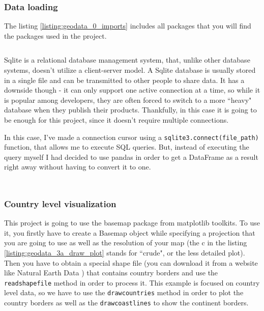 \documentclass[12pt, a4paper]{article}
\begin{document}
\subsubsection{Data loading}


The listing \ref{listing:geodata_0_imports} includes all packages that you will find the packages used in the project.

\bgroup
  \inputminted[linenos, breaklines=true, fontsize=\scriptsize]{python}{src/geo/map/0_imports.py}
  \label{listing:geodata_0_imports}
\egroup


Sqlite \cite{owens2010sqlite} is a relational database management system, that, unlike other database systems, doesn't utilize a client-server model. A Sqlite database is usually stored in a single file and can be transmitted to other people to share data. It has a downside though - it can only support one active connection at a time, so while it is popular among developers, they are often forced to switch to a more ``heavy" database when they publish their products. Thankfully, in this case it is going to be enough for this project, since it doesn't require multiple connections.

In this case, I've made a connection cursor using a \texttt{sqlite3.connect(file\_path)} function, that allows me to execute SQL queries. But, instead of executing the query myself I had decided to use pandas in order to get a DataFrame as a result right away without having to convert it to one.

\bgroup
  \inputminted[linenos, breaklines=true, fontsize=\scriptsize, firstnumber=last]{python}{src/geo/map/1_data_loading.py}
  \label{listing:geodata_1_data_loading}
\egroup

\bgroup
  \inputminted[linenos, breaklines=true, fontsize=\scriptsize, firstnumber=last]{python}{src/geo/map/2_duplicate_columns.py}
  \label{listing:geodata_2_duplicate_columns}
\egroup

\subsubsection{Country level visualization}

This project is going to use the basemap package from matplotlib toolkits.
To use it, you firstly have to create a Basemap object while specifying a projection that you are going to use as well as the resolution of your map (the c in the listing \ref{listing:geodata_3a_draw_plot} stands for ``crude", or the less detailed plot). Then you have to obtain a special shape file (you can download it from a website like Natural Earth Data \cite{naturalearthdata}) that contains country borders and use the \texttt{readshapefile} method in order to process it. This example is focused on country level data, so we have to use the \texttt{drawcountries} method in order to plot the country borders as well as the \texttt{drawcoastlines} to show the continent borders.
\end{document}
